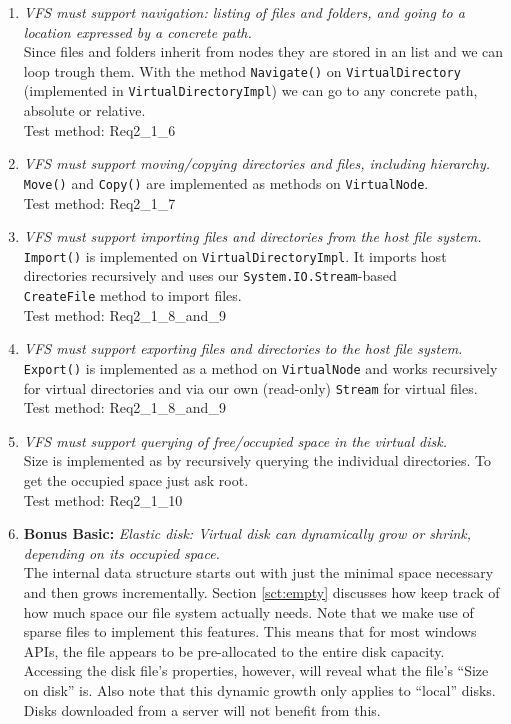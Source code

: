 \documentclass[a4paper,12pt]{article}
\begin{document}
\begin{enumerate}
	\item \emph{VFS must support navigation: listing of files and folders, and going to a location expressed by a
concrete path.}\\
		Since files and folders inherit from nodes they are stored in an list and we can loop trough them. With the method \texttt{Navigate()} on \texttt{VirtualDirectory} (implemented in \texttt{VirtualDirectoryImpl}) we can go to any concrete path, absolute or relative.\\
		Test method: Req2\_1\_6
	\item \emph{VFS must support moving/copying directories and files, including hierarchy.}\\
		\texttt{Move()} and \texttt{Copy()} are implemented as methods on \texttt{VirtualNode}.\\
		Test method: Req2\_1\_7
	\item \emph{VFS must support importing files and directories from the host file system.}\\
		\texttt{Import()} is implemented on \texttt{VirtualDirectoryImpl}. It imports host directories recursively and uses our \texttt{System.IO.Stream}-based\\\texttt{CreateFile} method to import files.\\
		Test method: Req2\_1\_8\_and\_9
	\item \emph{VFS must support exporting files and directories to the host file system.}\\
		\texttt{Export()} is implemented as a method on \texttt{VirtualNode} and works recursively for virtual directories and via our own (read-only) \texttt{Stream} for virtual files.\\
		Test method: Req2\_1\_8\_and\_9
	\item \emph{VFS must support querying of free/occupied space in the virtual disk.}\\
		Size is implemented as by recursively querying the individual directories. To get the occupied space just ask root.\\
		Test method: Req2\_1\_10
	\item \textbf{Bonus Basic:} \emph{Elastic disk: Virtual disk can dynamically grow or shrink, depending on its occupied space.}\\
		The internal data structure starts out with just the minimal space necessary and then grows incrementally.  
Section \ref{sct:empty} discusses how keep track of how much space our file system actually needs. Note that we make use of sparse files to implement this features. This means that for most windows APIs, the file appears to be pre-allocated to the entire disk capacity. Accessing the disk file's properties, however, will reveal what the file's ``Size on disk'' is. Also note that this dynamic growth only applies to ``local'' disks. Disks downloaded from a server will not benefit from this.

\end{enumerate}
\end{document}
